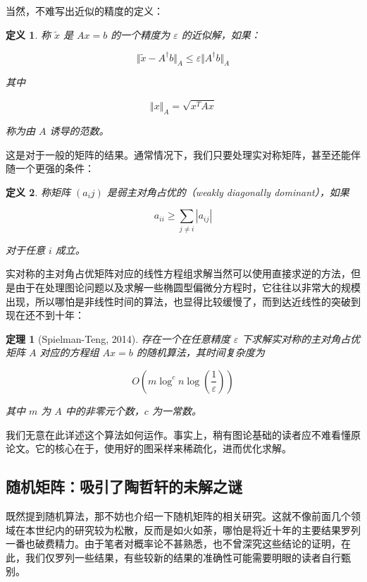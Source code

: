 \documentclass{ctexbook}
\newtheorem{definition}{定义}[chapter] %
\newtheorem{theorem}{定理}[chapter]
\begin{document}
当然，不难写出近似的精度的定义：

\begin{definition}
    称 $\tilde x$ 是 $Ax = b$ 的一个精度为 $\varepsilon$ 的近似解，如果：

    \[
    \Vert \tilde x - A^\dagger b \Vert_A \leqslant \varepsilon \Vert A^\dagger b \Vert_A
    \]

    其中

    \[
    \Vert x \Vert_A = \sqrt{x^TAx}
    \]

    称为由 $A$ 诱导的范数。
\end{definition}

这是对于一般的矩阵的结果。通常情况下，我们只要处理实对称矩阵，甚至还能伴随一个更强的条件：

\begin{definition}
    称矩阵 $(a_ij)$ 是弱主对角占优的（weakly diagonally dominant），如果

    \[
    a_{ii} \geqslant \sum_{j \neq i} |a_{ij}|
    \]

    对于任意 $i$ 成立。
\end{definition}

实对称的主对角占优矩阵对应的线性方程组求解当然可以使用直接求逆的方法，但是由于在处理图论问题以及求解一些椭圆型偏微分方程时，它往往以非常大的规模出现，所以哪怕是非线性时间的算法，也显得比较缓慢了，而到达近线性的突破到现在还不到十年：

\begin{theorem}[Spielman-Teng, 2014]
    存在一个在任意精度 $\varepsilon$ 下求解实对称的主对角占优矩阵 $A$ 对应的方程组 $Ax = b$ 的随机算法，其时间复杂度为

    \[
    O(m \log^c n \log(\frac{1}{\varepsilon}))
    \]

    其中 $m$ 为 $A$ 中的非零元个数，$c$ 为一常数。
\end{theorem}

我们无意在此详述这个算法如何运作。事实上，稍有图论基础的读者应不难看懂原论文。它的核心在于，使用好的图采样来稀疏化，进而优化求解。

\subsection{随机矩阵：吸引了陶哲轩的未解之谜}

既然提到随机算法，那不妨也介绍一下随机矩阵的相关研究。这就不像前面几个领域在本世纪内的研究较为松散，反而是如火如荼，哪怕是将近十年的主要结果罗列一番也破费精力。由于笔者对概率论不甚熟悉，也不曾深究这些结论的证明，在此，我们仅罗列一些结果，有些较新的结果的准确性可能需要明眼的读者自行甄别。
\end{document}
